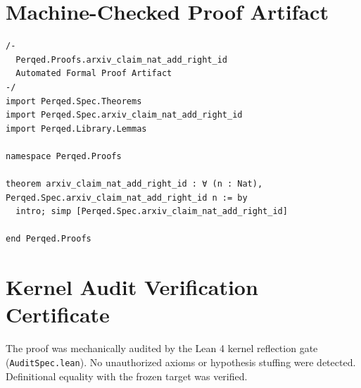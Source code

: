 \documentclass[11pt,a4paper]{article}
\begin{document}
\section{Machine-Checked Proof Artifact}
\begin{lstlisting}[language=Lean]
/-
  Perqed.Proofs.arxiv_claim_nat_add_right_id
  Automated Formal Proof Artifact
-/
import Perqed.Spec.Theorems
import Perqed.Spec.arxiv_claim_nat_add_right_id
import Perqed.Library.Lemmas

namespace Perqed.Proofs

theorem arxiv_claim_nat_add_right_id : ∀ (n : Nat), Perqed.Spec.arxiv_claim_nat_add_right_id n := by
  intro; simp [Perqed.Spec.arxiv_claim_nat_add_right_id]

end Perqed.Proofs
\end{lstlisting}

\section{Kernel Audit Verification Certificate}
The proof was mechanically audited by the Lean 4 kernel reflection gate (\texttt{AuditSpec.lean}). No unauthorized axioms or hypothesis stuffing were detected. Definitional equality with the frozen target was verified.
\end{document}
